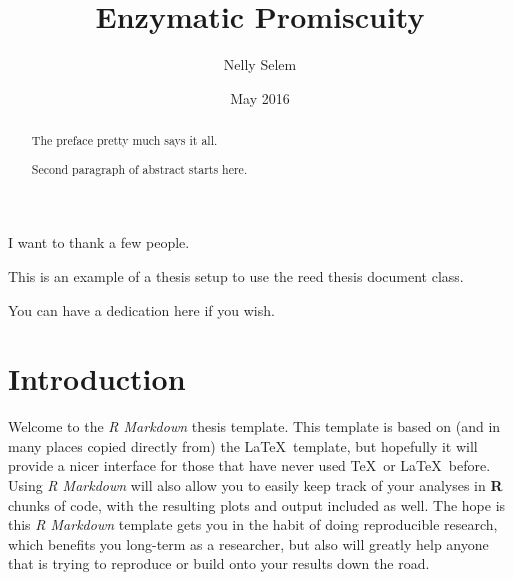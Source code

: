 \documentclass[12pt,twoside]{reedthesis}
\title{Enzymatic Promiscuity}
\author{Nelly Selem}
\date{May 2016}
\begin{document}
      \maketitle
  
  \frontmatter %
  \pagestyle{empty} %

      \begin{acknowledgements}
      I want to thank a few people.
    \end{acknowledgements}
  
      \begin{preface}
      This is an example of a thesis setup to use the reed thesis document
      class.
    \end{preface}
  
      \hypersetup{linkcolor=black}
    \setcounter{tocdepth}{2}
    \tableofcontents
  
      \listoftables
  
      \listoffigures
  
      \begin{abstract}
      The preface pretty much says it all. \par  Second paragraph of abstract
      starts here.
    \end{abstract}
  
      \begin{dedication}
      You can have a dedication here if you wish.
    \end{dedication}
  
  \mainmatter %
  \pagestyle{fancyplain} %

  \chapter*{Introduction}\label{introduction}
  
  Welcome to the \emph{R Markdown} thesis template. This template is based
  on (and in many places copied directly from) the \LaTeX~template, but
  hopefully it will provide a nicer interface for those that have never
  used \TeX~or \LaTeX~before. Using \emph{R Markdown} will also allow you
  to easily keep track of your analyses in \textbf{R} chunks of code, with
  the resulting plots and output included as well. The hope is this
  \emph{R Markdown} template gets you in the habit of doing reproducible
  research, which benefits you long-term as a researcher, but also will
  greatly help anyone that is trying to reproduce or build onto your
  results down the road.
  
\end{document}
